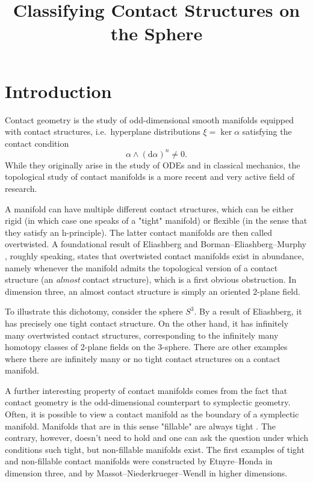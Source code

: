 \documentclass{amsart}
\renewcommand*{\d}{\mathrm{d}}
\begin{document}
\title{Classifying Contact Structures on the Sphere}
\address{}
\date{}

\maketitle
\section*{Introduction}
Contact geometry is the study of odd-dimensional smooth manifolds equipped with contact structures, i.e.\ hyperplane distributions $\xi = \ker \alpha$ satisfying the contact condition
\[
    \alpha \wedge (\d \alpha)^n \neq 0.
\]
While they originally arise in the study of ODEs and in classical mechanics, the topological study of contact manifolds is a more recent and very active field of research.

A manifold can have multiple different contact structures, which can be either rigid (in which case one speaks of a "tight" manifold) or flexible (in the sense that they satisfy an h-principle). The latter contact manifolds are then called overtwisted. A foundational result of Eliashberg \cite{Eliashberg89} and Borman--Eliashberg--Murphy \cite{BEM15}, roughly speaking, states that overtwisted contact manifolds exist in abundance, namely whenever the manifold admits the topological version of a contact structure (an \emph{almost} contact structure), which is a first obvious obstruction. In dimension three, an almost contact structure is simply an oriented $2$-plane field.

To illustrate this dichotomy, consider the sphere $S^3$. By a result of Eliashberg, it has precisely one tight contact structure. On the other hand, it has infinitely many overtwisted contact structures, corresponding to the infinitely many homotopy classes of 2-plane fields on the 3-sphere. There are other examples where there are infinitely many or no tight contact structures on a contact manifold.

A further interesting property of contact manifolds comes from the fact that contact geometry is the odd-dimensional counterpart to symplectic geometry. Often, it is possible to view a contact manifold as the boundary of a symplectic manifold. Manifolds that are in this sense "fillable" are always tight \cite{Gromov85,Eliashberg91}. The contrary, however, doesn't need to hold and one can ask the question under which conditions such tight, but non-fillable manifolds exist. The first examples of tight and non-fillable contact manifolds were constructed by Etnyre--Honda \cite{EH02} in dimension three, and by Massot--Niederkrueger--Wendl \cite{MNW13} in higher dimensions.
\end{document}
